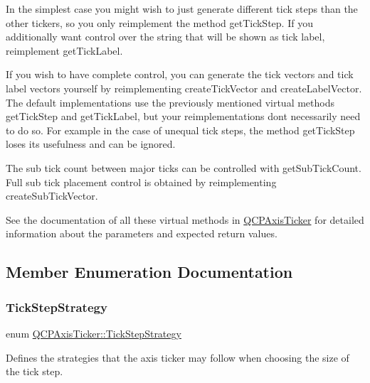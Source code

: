 In the simplest case you might wish to just generate different tick steps than the other tickers, so you only reimplement the method get\+Tick\+Step. If you additionally want control over the string that will be shown as tick label, reimplement get\+Tick\+Label.

If you wish to have complete control, you can generate the tick vectors and tick label vectors yourself by reimplementing create\+Tick\+Vector and create\+Label\+Vector. The default implementations use the previously mentioned virtual methods get\+Tick\+Step and get\+Tick\+Label, but your reimplementations don\textquotesingle{}t necessarily need to do so. For example in the case of unequal tick steps, the method get\+Tick\+Step loses its usefulness and can be ignored.

The sub tick count between major ticks can be controlled with get\+Sub\+Tick\+Count. Full sub tick placement control is obtained by reimplementing create\+Sub\+Tick\+Vector.

See the documentation of all these virtual methods in \mbox{\hyperlink{class_q_c_p_axis_ticker}{Q\+C\+P\+Axis\+Ticker}} for detailed information about the parameters and expected return values. 

\subsection{Member Enumeration Documentation}
\mbox{\label{class_q_c_p_axis_ticker_ab6d2f9d9477821623ac9bc4b21ddf49a}} 
\subsubsection{\texorpdfstring{Tick\+Step\+Strategy}{TickStepStrategy}}
{\footnotesize\ttfamily enum \mbox{\hyperlink{class_q_c_p_axis_ticker_ab6d2f9d9477821623ac9bc4b21ddf49a}{Q\+C\+P\+Axis\+Ticker\+::\+Tick\+Step\+Strategy}}}

Defines the strategies that the axis ticker may follow when choosing the size of the tick step.

